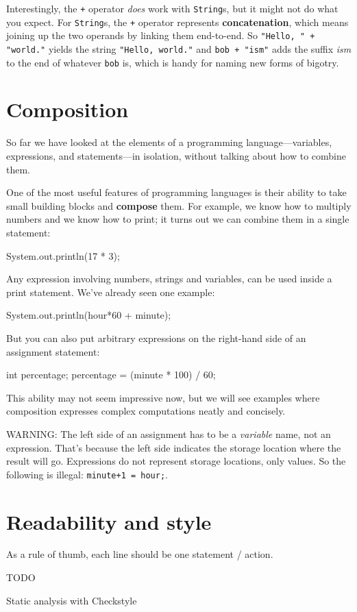 
Interestingly, the {\tt +} operator {\em does} work with {\tt String}s, but it might not do what you expect.
For {\tt String}s, the {\tt +} operator represents {\bf concatenation}, which means joining up the two operands by linking them end-to-end.
So {\tt "Hello, " + "world."} yields the string {\tt "Hello, world."} and {\tt bob + "ism"} adds the suffix {\em ism} to the end of whatever {\tt bob} is, which is handy for naming new forms of bigotry.


\section{Composition}


So far we have looked at the elements of a programming language---variables, expressions, and statements---in isolation, without talking about how to combine them.

One of the most useful features of programming languages is their ability to take small building blocks and {\bf compose} them.
For example, we know how to multiply numbers and we know how to print; it turns out we can combine them in a single statement:

\begin{code}
    System.out.println(17 * 3);
\end{code}

Any expression involving numbers, strings and variables, can be used inside a print statement.
We've already seen one example:

\begin{code}
    System.out.println(hour*60 + minute);
\end{code}

But you can also put arbitrary expressions on the right-hand side of an assignment statement:

\begin{code}
    int percentage;
    percentage = (minute * 100) / 60;
\end{code}

This ability may not seem impressive now, but we will see examples where composition expresses complex computations neatly and concisely.

WARNING: The left side of an assignment has to be a {\em variable} name, not an expression.
That's because the left side indicates the storage location where the result will go.
Expressions do not represent storage locations, only values.
So the following is illegal: {\tt minute+1 = hour;}.


\section{Readability and style}

As a rule of thumb, each line should be one statement / action.

TODO

Static analysis with Checkstyle
